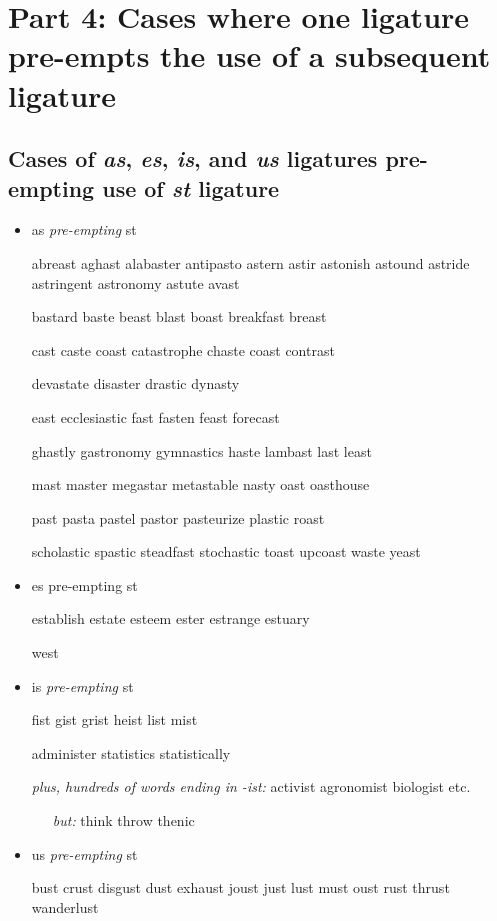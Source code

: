 


\section*{Part 4: Cases where one ligature pre-empts the use of a subsequent ligature}

\subsection*{Cases of \emph{as}, {\ebg \emph{es}}, \emph{is}, and \emph{us} ligatures pre-empting use of \emph{st} ligature}

\bgroup \em


\begin{itemize}
\item as \emph{pre-empting} st

abreast aghast alabaster antipasto astern astir astonish astound astride astringent astronomy astute avast

bastard baste beast blast boast breakfast breast 

cast caste coast catastrophe chaste coast contrast 

devastate disaster drastic dynasty 

east ecclesiastic fast fasten feast forecast 

ghastly gastronomy gymnastics haste lambast last least 

mast master megastar metastable nasty oast oasthouse

past pasta pastel pastor pasteurize plastic roast 

scholastic spastic steadfast stochastic toast upcoast waste yeast


\item {\ebg es} pre-empting st

{\ebg

establish
estate
esteem
ester
estrange
estuary

west
}



\item is \emph{pre-empting} st

fist gist grist heist list mist 

administer statistics statistically

\emph{plus, \emph{hundreds} of words ending in -ist:}
activist agronomist biologist etc.

\ \ \ \emph{but:} \-think \-throw \-thenic



\item us \emph{pre-empting} st

bust crust disgust dust exhaust joust just lust must oust rust thrust wanderlust

\end{itemize}
\egroup


